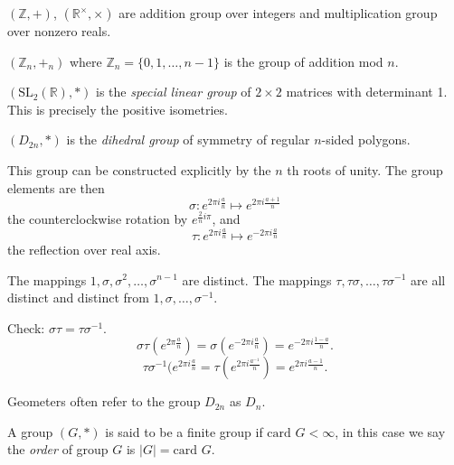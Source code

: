 \begin{example}
	$(\mathbb{Z}, +)$, $\left( \mathbb{R}^\times , \times  \right) $ are addition group over integers and multiplication group over nonzero reals.
\end{example}

\begin{example}
	$\left( \mathbb{Z}_n, +_n \right)$ where $\mathbb{Z}_n = \{0,1,\ldots,n -1 \} $ is the group of addition mod $n$.
\end{example}

\begin{example}
	$(\text{SL}_2(\mathbb{R}), *)$ is the \textit{special linear group} of $2\times 2$ matrices with determinant 1. This is precisely the positive isometries.
\end{example}

\begin{example}
	$(D_{2n}, *)$ is the \textit{dihedral group} of symmetry of regular $n$-sided polygons.
	
	This group can be constructed explicitly by the $n$ th roots of unity. The group elements are then 
	\[
	\sigma : e^{2 \pi i \frac{a}{n}} \mapsto e^{2 \pi i \frac{a+1}{n}}
	\] the counterclockwise rotation by $e^{\frac{2}{n} i \pi}$, and 
	\[
	\tau: e^{2 \pi i \frac{a}{n}} \mapsto e^{-2 \pi i \frac{a}{n}}
	\] the reflection over real axis.

	The mappings $1, \sigma, \sigma^2, \ldots, \sigma^{n-1}$ are distinct. The mappings $\tau, \tau\sigma, \ldots, \tau\sigma^{-1}$ are all distinct and distinct from $1, \sigma, \ldots, \sigma^{-1}$.

	Check: $\sigma \tau = \tau \sigma^{-1} $. \[
	\sigma\tau\left( e^{2 \pi \frac{a}{n}} \right)  = \sigma\left( e^{- 2 \pi i \frac{a}{n}} \right) = e^{-2 \pi i \frac{1-a}{n}}
	.\] 
	\[
	\tau\sigma^{-1}(e^{2 \pi i \frac{a}{n}} = \tau\left( e^{2 \pi i \frac{a^{-1} }{n}} \right) =e^{2 \pi i \frac{a -1}{n}}
	.\] 
\end{example}

\begin{remark}
	Geometers often refer to the group $D_{2n}$ as $D_n$.
\end{remark}

\begin{definition}
	A group $(G, *)$ is said to be a finite group if $\text{card }G < \infty $, in this case we say the \textit{order} of group $G$ is $|G| = \text{card } G$.
\end{definition}

